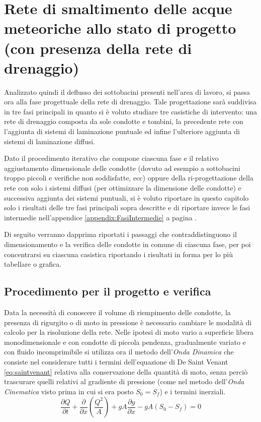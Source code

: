 \chapter{Rete di smaltimento delle acque meteoriche allo stato di progetto (con presenza
della rete di drenaggio)} \label{cap:ProgettoRete}
Analizzato quindi il deflusso dei sottobacini presenti nell'area di lavoro, si passa ora alla fase progettuale della rete di drenaggio. 
Tale progettazione sarà suddivisa in tre fasi principali in quanto si è voluto studiare tre casistiche di intervento: una rete di drenaggio composta da sole condotte e tombini, la precedente rete con l'aggiunta di sistemi di laminazione puntuale ed infine l'ulteriore aggiunta di sistemi di laminazione diffusi.

Dato il procedimento iterativo che compone ciascuna fase e il relativo aggiustamento dimensionale delle condotte (dovuto ad esempio  a sottobacini troppo piccoli e verifiche non soddisfatte, ecc) oppure della ri-progettazione della rete con solo i sistemi diffusi (per ottimizzare la dimensione delle condotte) e successiva aggiunta dei sistemi puntuali, si è voluto riportare in questo capitolo solo i risultati delle tre fasi principali sopra descritte e di  riportare invece le fasi intermedie nell'appendice \ref{appendix:FasiIntermedie} a pagina \pageref{appendix:FasiIntermedie}. 

Di seguito verranno dapprima riportati i passaggi che contraddistinguono il dimensionamento e la verifica delle condotte in comune di ciascuna fase, per poi concentrarsi su ciascuna casistica riportando i risultati in forma per lo più tabellare o grafica.

\section{Procedimento per il progetto e verifica}
Data la necessità di conoscere il volume di riempimento delle condotte, la presenza di rigurgito o di moto in pressione è necessario cambiare le modalità di calcolo per la risoluzione della rete.
Nelle ipotesi di moto vario a superficie libera monodimensionale e con condotte di piccola pendenza, gradualmente variato e con fluido incomprimibile si utilizza ora il metodo dell'\emph{Onda Dinamica} che consiste nel considerare tutti i termini dell'equazione di De Saint Venant \ref{eq:saintvenant} relativa alla conservazione della quantità di moto, senza perciò trascurare quelli relativi al gradiente di pressione (come nel metodo dell'\emph{Onda Cinematica} visto prima in cui si era posto $S_0 = S_f$) e i termini inerziali. 
\begin{equation}
    \label{eq:saintvenant}
    \frac{\partial Q}{\partial t} + \frac{\partial}{\partial x} \left( \frac{Q^2}{A} \right) + g A \frac{\partial y}{\partial x} - g A (S_0 - S_f) = 0
 \end{equation}

